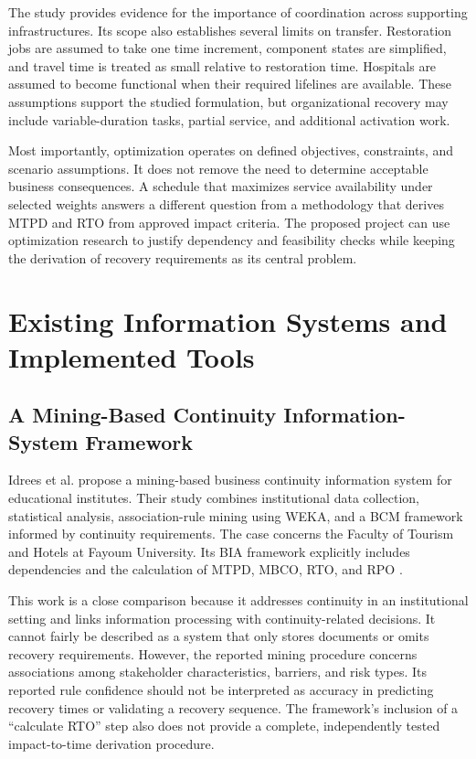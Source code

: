 The study provides evidence for the importance of coordination across supporting infrastructures. Its scope also establishes several limits on transfer. Restoration jobs are assumed to take one time increment, component states are simplified, and travel time is treated as small relative to restoration time. Hospitals are assumed to become functional when their required lifelines are available. These assumptions support the studied formulation, but organizational recovery may include variable-duration tasks, partial service, and additional activation work.

Most importantly, optimization operates on defined objectives, constraints, and scenario assumptions. It does not remove the need to determine acceptable business consequences. A schedule that maximizes service availability under selected weights answers a different question from a methodology that derives MTPD and RTO from approved impact criteria. The proposed project can use optimization research to justify dependency and feasibility checks while keeping the derivation of recovery requirements as its central problem.

\section{Existing Information Systems and Implemented Tools}

\subsection{A Mining-Based Continuity Information-System Framework}

Idrees et al. propose a mining-based business continuity information system for educational institutes. Their study combines institutional data collection, statistical analysis, association-rule mining using WEKA, and a BCM framework informed by continuity requirements. The case concerns the Faculty of Tourism and Hotels at Fayoum University. Its BIA framework explicitly includes dependencies and the calculation of MTPD, MBCO, RTO, and RPO \cite{idrees2019bcis}.

This work is a close comparison because it addresses continuity in an institutional setting and links information processing with continuity-related decisions. It cannot fairly be described as a system that only stores documents or omits recovery requirements. However, the reported mining procedure concerns associations among stakeholder characteristics, barriers, and risk types. Its reported rule confidence should not be interpreted as accuracy in predicting recovery times or validating a recovery sequence. The framework's inclusion of a ``calculate RTO'' step also does not provide a complete, independently tested impact-to-time derivation procedure.

